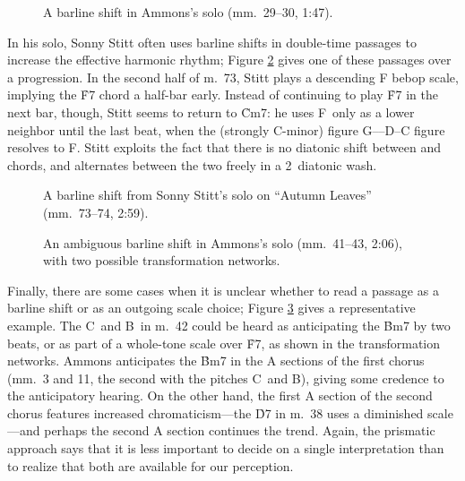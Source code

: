 \begin{figure}[tbp]
  \caption[A barline shift from Ammons's solo.]{A barline shift in Ammons's
    solo (mm.~29--30, 1:47).}
  \label{csa:metric-delay}
\end{figure}

In his solo, Sonny Stitt often uses barline shifts in double-time passages to
increase the effective harmonic rhythm; Figure \ref{csa:stitt-double-time}
gives one of these passages over a \tf progression. In the second
half of m.~73, Stitt plays a descending F bebop scale, implying the \h{F7}
chord a half-bar early. Instead of continuing to play \h{F7} in the
next bar, though, Stitt seems to return to \h{Cm7}: he uses F\sharp\ only as a
lower neighbor until the last beat, when the (strongly C-minor) figure
G--\Eflat--D--C figure resolves to F\nat. Stitt exploits the fact that there
is no diatonic shift between \ii and \V chords, and alternates between the
two freely in a 2\flat\ diatonic wash.

\begin{figure}[tbp]
  \caption[A barline shift from Sonny Stitt's solo on ``Autumn Leaves.'']{A
    barline shift from Sonny Stitt's solo on ``Autumn Leaves'' (mm.~73--74,
    2:59).}
  \label{csa:stitt-double-time}
\end{figure}

\begin{figure}[tbp]
  \caption[An ambiguous barline shift in Ammons's solo, with two possible
  transformation networks.]{An ambiguous barline shift in Ammons's
  solo (mm.~41--43, 2:06), with two possible transformation networks.}
  \label{csa:metric-parsing}
\end{figure}

Finally, there are some cases when it is unclear whether to read a passage as
a barline shift or as an outgoing scale choice; Figure
\ref{csa:metric-parsing} gives a representative example. The
C\sharp\ and B\nat\ in m.~42 could be heard as anticipating the \h{Bm7} by two
beats, or as part of a whole-tone scale over \h{F7}, as shown in the
transformation networks. Ammons anticipates the \h{Bm7} in the A sections of
the first chorus (mm.~3 and 11, the second with the pitches C\sharp\ and
B\nat), giving some credence to the anticipatory hearing. On the other hand,
the first A section of the second chorus features increased chromaticism---the
\h{D7} in m.~38 uses a diminished scale---and perhaps the second A section
continues the trend. Again, the prismatic approach says that it is less
important to decide on a single interpretation than to realize that both
are available for our perception.

